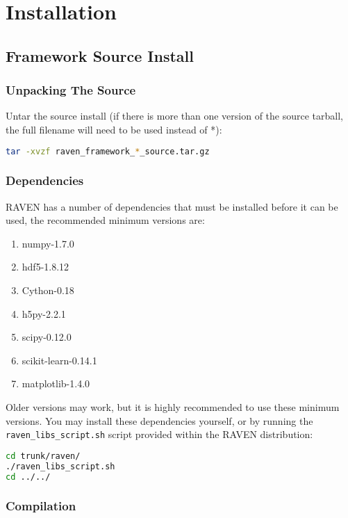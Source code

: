 \section{Installation}

\subsection{Framework Source Install}

\subsubsection{Unpacking The Source}

Untar the source install (if there is more than one version of the
source tarball, the full filename will need to be used instead of *):

\begin{lstlisting}[language=bash]
tar -xvzf raven_framework_*_source.tar.gz
\end{lstlisting}

\subsubsection{Dependencies}
\label{raven_dependencies}
RAVEN has a number of dependencies that must be installed before it can be used,
the recommended minimum versions are:

\begin{enumerate}
\item numpy-1.7.0
\item hdf5-1.8.12
\item Cython-0.18
\item h5py-2.2.1
\item scipy-0.12.0
\item scikit-learn-0.14.1
\item matplotlib-1.4.0
\end{enumerate}

Older versions may work, but it is highly recommended to use these minimum 
versions.
%
You may install these dependencies yourself, or by running the
\texttt{raven\_libs\_script.sh} script provided within the RAVEN distribution:

\begin{lstlisting}[language=bash]
cd trunk/raven/
./raven_libs_script.sh
cd ../../
\end{lstlisting}

\subsubsection{Compilation}

